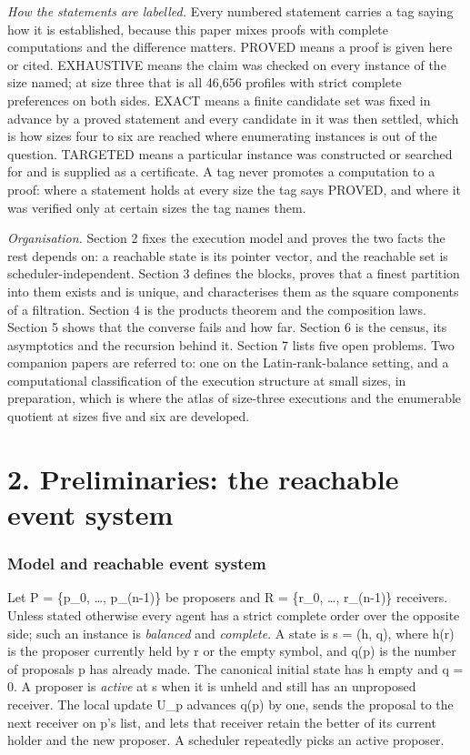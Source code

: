 \documentclass[
  11pt,
]{article}
\begin{document}
\emph{How the statements are labelled.} Every numbered statement carries
a tag saying how it is established, because this paper mixes proofs with
complete computations and the difference matters. PROVED means a proof
is given here or cited. EXHAUSTIVE means the claim was checked on every
instance of the size named; at size three that is all 46,656 profiles
with strict complete preferences on both sides. EXACT means a finite
candidate set was fixed in advance by a proved statement and every
candidate in it was then settled, which is how sizes four to six are
reached where enumerating instances is out of the question. TARGETED
means a particular instance was constructed or searched for and is
supplied as a certificate. A tag never promotes a computation to a
proof: where a statement holds at every size the tag says PROVED, and
where it was verified only at certain sizes the tag names them.

\emph{Organisation.} Section 2 fixes the execution model and proves the
two facts the rest depends on: a reachable state is its pointer vector,
and the reachable set is scheduler-independent. Section 3 defines the
blocks, proves that a finest partition into them exists and is unique,
and characterises them as the square components of a filtration. Section
4 is the products theorem and the composition laws. Section 5 shows that
the converse fails and how far. Section 6 is the census, its asymptotics
and the recursion behind it. Section 7 lists five open problems. Two
companion papers are referred to: one on the Latin-rank-balance setting,
and a computational classification of the execution structure at small
sizes, in preparation, which is where the atlas of size-three executions
and the enumerable quotient at sizes five and six are developed.


\hypertarget{preliminaries-the-reachable-event-system}{%
\section{2. Preliminaries: the reachable event
system}\label{preliminaries-the-reachable-event-system}}

\hypertarget{model-and-reachable-event-system}{%
\subsubsection{Model and reachable event
system}\label{model-and-reachable-event-system}}

Let P = \{p\_0, \ldots, p\_(n-1)\} be proposers and R = \{r\_0, \ldots,
r\_(n-1)\} receivers. Unless stated otherwise every agent has a strict
complete order over the opposite side; such an instance is
\emph{balanced} and \emph{complete}. A state is s = (h, q), where h(r)
is the proposer currently held by r or the empty symbol, and q(p) is the
number of proposals p has already made. The canonical initial state has
h empty and q = 0. A proposer is \emph{active} at s when it is unheld
and still has an unproposed receiver. The local update U\_p advances
q(p) by one, sends the proposal to the next receiver on p's list, and
lets that receiver retain the better of its current holder and the new
proposer. A scheduler repeatedly picks an active proposer.
\end{document}

